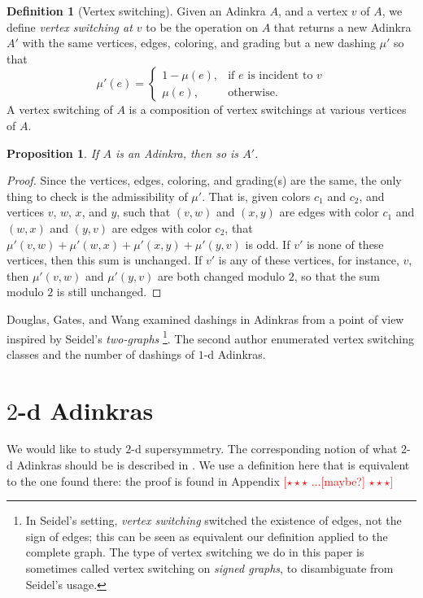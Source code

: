 \documentclass[12pt,twoside,singlespace]{article}
\numberwithin{equation}{section}
\newtheorem{prop}[equation]{Proposition}
\theoremstyle{definition}
\newtheorem{definition}[equation]{Definition}
\newcommand{\com}[1]{\textcolor{red}{$[\star \star \star$ #1 $\star \star \star]$}}
\begin{document}
\begin{definition}[Vertex switching]
Given an Adinkra $A$, and a vertex $v$ of $A$, we define \emph{vertex switching at $v$} to be the operation on $A$ that returns a new Adinkra $A'$ with the same vertices, edges, coloring, and grading but a new dashing $\mu'$ so that
\begin{equation}
\mu'(e)=\begin{cases}
1-\mu(e),&\mbox{if $e$ is incident to $v$}\\
\mu(e),&\mbox{otherwise.}
\end{cases}
\end{equation}
A vertex switching of $A$ is a composition of vertex switchings at various vertices of $A$.
\end{definition}

\begin{prop}
\label{prop:switching-still-adinkra}
If $A$ is an Adinkra, then so is $A'$.
\end{prop}
\begin{proof}
Since the vertices, edges, coloring, and grading(s) are the same, the only thing to check is the admissibility of $\mu'$.  That is, given colors $c_1$ and $c_2$, and vertices $v$, $w$, $x$, and $y$, such that $(v,w)$ and $(x,y)$ are edges with color $c_1$ and $(w,x)$ and $(y,v)$ are edges with color $c_2$, that $\mu'(v,w)+\mu'(w,x)+\mu'(x,y)+\mu'(y,v)$ is odd.  If $v'$ is none of these vertices, then this sum is unchanged.  If $v'$ is any of these vertices, for instance, $v$, then $\mu'(v,w)$ and $\mu'(y,v)$ are both changed modulo $2$, so that the sum modulo $2$ is still unchanged.
\end{proof}

Douglas, Gates, and Wang \cite{douglas} examined dashings in Adinkras from a point of view inspired by Seidel's \emph{two-graphs} \cite{seidel:survey} \footnote{In Seidel's setting, \emph{vertex switching} switched the existence of edges, not the sign of edges; this can be seen as equivalent our definition applied to the complete graph. The type of vertex switching we do in this paper is sometimes called vertex switching on \emph{signed graphs}, to disambiguate from Seidel's usage.}. The second author \cite{zhang:adinkras} enumerated vertex switching classes and the number of dashings of $1$-d Adinkras.

\section{$2$-d Adinkras}
We would like to study $2$-d supersymmetry. The corresponding notion of what $2$-d Adinkras should be is described in \cite{gates:dimensional_extension,hubsch:weaving}.  We use a definition here that is equivalent to the one found there: the proof is found in Appendix \com{...[maybe?]}
\end{document}
